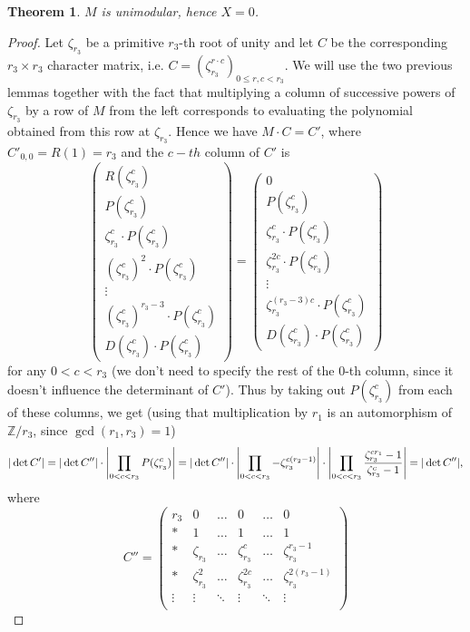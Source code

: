 \documentclass[12pt,a4paper]{article}
\newtheorem{theorem}{Theorem}
\theoremstyle{definition}
\newcommand{\Z}{\mathbb{Z}}
\newcommand{\zt}{\zeta_{r_3}}
\DeclarePairedDelimiter\abs{\lvert}{\rvert}
\begin{document}
\begin{theorem}
$M$ is unimodular, hence $X=0$.
\end{theorem}
\begin{proof}
Let $\zt$ be a primitive $r_3$-th root of unity and let $C$ be the corresponding $r_3\times r_3$ character matrix, i.e. $C=(\zt^{r\cdot c})_{0\leq r,c<r_3}$. We will use the two previous lemmas together with the fact that multiplying a column of successive powers of $\zt$ by a row of $M$ from the left corresponds to evaluating the polynomial obtained from this row at $\zt$. %
Hence we have $M\cdot C=C'$, where $C'_{0,0}=R(1)=r_3$ and the $c-th$ column of $C'$ is
$$
\begin{pmatrix}
R(\zt^c)\\ 
P(\zt^c) \\ 
\zt^c \cdot P(\zt^c) \\ 
(\zt^{c})^2 \cdot P(\zt^c) \\ 
\vdots\\ 
(\zt^{c})^{r_3-3} \cdot P(\zt^c) \\ 
D(\zt^c) \cdot P(\zt^c)
\end{pmatrix}
=
\begin{pmatrix}
0\\ 
P(\zt^c) \\ 
\zt^c \cdot P(\zt^c) \\ 
\zt^{2c} \cdot P(\zt^c) \\ 
\vdots\\ 
\zt^{(r_3-3)c} \cdot P(\zt^c) \\ 
D(\zt^c) \cdot P(\zt^c)
\end{pmatrix}
$$
for any $0<c<r_3$ (we don't need to specify the rest of the $0$-th column, since it doesn't influence the determinant of $C'$). Thus by taking out $P(\zt^c)$ from each of these columns, we get (using that multiplication by $r_1$ is an automorphism of $\Z/r_3$, since $\gcd(r_1,r_3)=1$)
$$|\det C'|=|\det C''|\cdot\abs*{\prod_{0<c<r_3}P(\zt^c)}=|\det C''|\cdot\abs*{\prod_{0<c<r_3}-\zt^{c(r_2-1)}}\cdot\abs*{\prod_{0<c<r_3}\frac{\zt^{cr_1}-1}{\zt^c-1}}=|\det C''|,$$
where
$$C''=
\begin{pmatrix}
r_3& 0& \dots & 0 & \dots & 0\\ 
*& 1& \dots & 1 & \dots & 1\\ 
*& \zt& \dots & \zt^c & \dots & \zt^{r_3-1}\\ 
*& \zt^2& \dots & \zt^{2c} & \dots & \zt^{2(r_3-1)}\\ 
\vdots& \vdots&\ddots  & \vdots & \ddots & \vdots\\ 

\end{pmatrix}$$
\end{proof}
\end{document}
